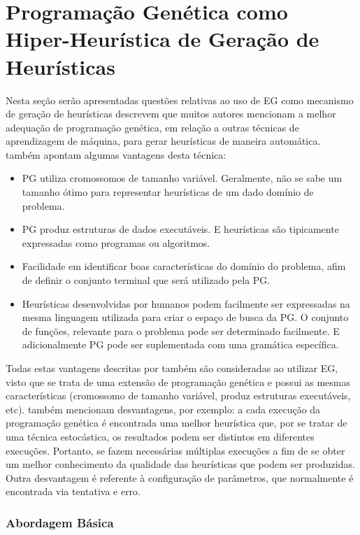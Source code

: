 \section{Programação Genética como Hiper-Heurística de Geração de Heurísticas}
\label{subsubsection:PGasHH}

Nesta seção serão apresentadas questões relativas ao uso de EG como mecanismo de geração de heurísticas  \cite{burke2009exploring} descrevem que muitos autores mencionam a melhor adequação de programação genética, em relação a outras técnicas de aprendizagem de máquina, para gerar heurísticas de maneira automática. \cite{burke2009exploring} também apontam algumas vantagens desta técnica:

\begin{itemize}
	\item PG utiliza cromossomos de tamanho variável. Geralmente, não se sabe um tamanho ótimo para representar heurísticas de um dado domínio de problema.
	\item PG produz estruturas de dados executáveis. E heurísticas são tipicamente expressadas como programas ou algoritmos.
	\item Facilidade em identificar boas características do domínio do problema, afim de definir o conjunto terminal que será utilizado pela PG.
	\item Heurísticas desenvolvidas por humanos podem facilmente ser expressadas na mesma linguagem utilizada para criar o espaço de busca da PG. O conjunto de funções, relevante para o problema pode ser determinado facilmente. E adicionalmente PG pode ser suplementada com uma gramática específica.
\end{itemize}

Todas estas vantagens descritas por \cite{burke2009exploring} também são consideradas ao utilizar EG, visto que se trata de uma extensão de programação genética e possui as mesmas características (cromossomo de tamanho variável, produz estruturas executáveis, etc). \cite{burke2009exploring} também mencionam desvantagens, por exemplo: a cada execução da programação genética é encontrada uma melhor heurística que, por se tratar de uma técnica estocástica, os resultados podem ser distintos em diferentes execuções. Portanto, se fazem necessárias múltiplas execuções a fim de se obter um melhor conhecimento da qualidade das heurísticas que podem ser produzidas. Outra desvantagem é referente à configuração de parâmetros, que normalmente é encontrada via tentativa e erro.

\subsubsection{Abordagem Básica}

